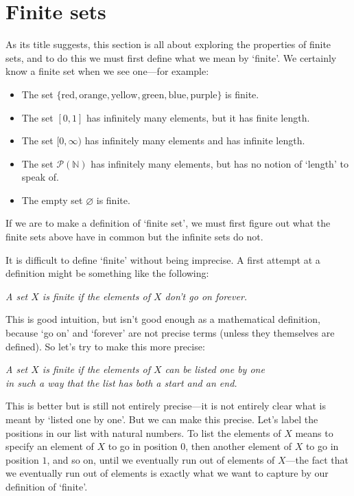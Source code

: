 \section{Finite sets}

As its title suggests, this section is all about exploring the properties of finite sets, and to do this we must first define what we mean by `finite'. We certainly know a finite set when we see one---for example:
\begin{itemize}
\item The set $\{ \text{red}, \text{orange}, \text{yellow}, \text{green}, \text{blue}, \text{purple} \}$ is finite.
\item The set $[0,1]$ has infinitely many elements, but it has finite length.
\item The set $[0,\infty)$ has infinitely many elements and has infinite length.
\item The set $\mathcal{P}(\mathbb{N})$ has infinitely many elements, but has no notion of `length' to speak of.
\item The empty set $\varnothing$ is finite.
\end{itemize}

If we are to make a definition of `finite set', we must first figure out what the finite sets above have in common but the infinite sets do not.

It is difficult to define `finite' without being imprecise. A first attempt at a definition might be something like the following:
\begin{center}
\textit{A set $X$ is finite if the elements of $X$ don't go on forever.}
\end{center}
This is good intuition, but isn't good enough as a mathematical definition, because `go on' and `forever' are not precise terms (unless they themselves are defined). So let's try to make this more precise:
\begin{center}
\textit{A set $X$ is finite if the elements of $X$ can be listed one by one\\
in such a way that the list has both a start and an end.}
\end{center}
This is better but is still not entirely precise---it is not entirely clear what is meant by `listed one by one'. But we can make this precise. Let's label the positions in our list with natural numbers. To list the elements of $X$ means to specify an element of $X$ to go in position $0$, then another element of $X$ to go in position $1$, and so on, until we eventually run out of elements of $X$---the fact that we eventually run out of elements is exactly what we want to capture by our definition of `finite'.

